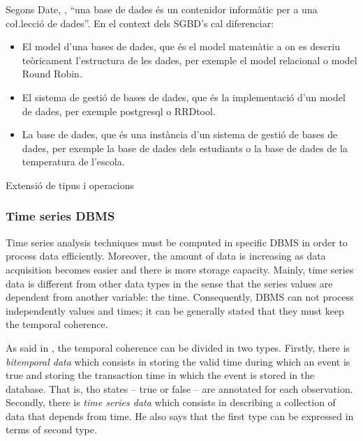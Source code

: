 Segons Date, \cite{date}, ``una base de dades és un contenidor
informàtic per a una co\l.lecció de dades''. En el context dels SGBD's
cal diferenciar:
\begin{itemize}
\item El model d'una bases de dades, que és el model matemàtic a on es
  descriu teòricament l'estructura de les dades, per exemple el model
  relacional o model Round Robin.

\item El sistema de gestió de bases de dades, que és la implementació
  d'un model de dades, per exemple postgresql o
  RRDtool. %

\item La base de dades, que és una instància d'un sistema de gestió de
  bases de dades, per exemple la base de dades dels estudiants o la
  base de dades de la temperatura de l'escola.
\end{itemize}


Extensió de tipus i operacions \parencite{stonebraker86}


\subsubsection{Time series DBMS}

Time series analysis techniques must be computed in specific DBMS in order to process data efficiently. Moreover, the amount of data is increasing as data acquisition becomes easier and there is more storage capacity. 
Mainly, time series data is different from other data types in the sense that the series values are dependent from another variable: the time. Consequently, DBMS can not process independently values and times; it can be generally stated that they must keep the temporal coherence. 


As said in \textcite{assfalg08:thesis}, the temporal coherence can be divided in two types. Firstly, there is  \emph{bitemporal data} which consists in storing the valid time during which an event is true and storing the transaction time in which the event is stored in the database. That is, tho states -- true or false -- are annotated for each observation.  Secondly, there is \emph{time series data} which consists in describing a collection of data that depends from time. He also says that the first type can be expressed in terms of second type.

